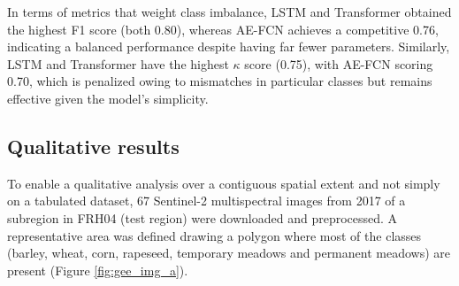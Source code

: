 \documentclass[journal,article,submit,pdftex,moreauthors]{Definitions/mdpi}
\begin{document}
In terms of metrics that weight class imbalance, LSTM and Transformer obtained the highest F1 score (both 0.80), whereas AE-FCN achieves a competitive 0.76, indicating a balanced performance despite having far fewer parameters. Similarly, LSTM and Transformer have the highest $\kappa$ score (0.75), with AE-FCN scoring 0.70, which is penalized owing to mismatches in particular classes but remains effective given the model's simplicity.

\subsection{Qualitative results}

To enable a qualitative analysis over a contiguous spatial extent and not simply on a tabulated dataset, 67 Sentinel-2 multispectral images from 2017 of a subregion in FRH04 (test region) were downloaded and preprocessed.
A representative area was defined drawing a polygon where most of the classes (barley, wheat, corn, rapeseed, temporary meadows and permanent meadows) are present (Figure \ref{fig:gee_img_a}). 
\end{document}
